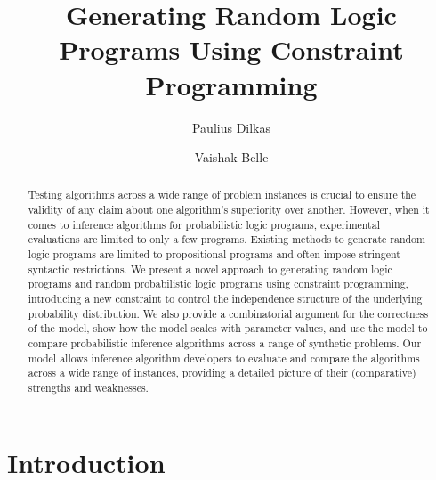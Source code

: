 \documentclass[runningheads]{llncs}
\begin{document}
\title{Generating Random Logic Programs Using Constraint Programming}
\author{Paulius Dilkas \and Vaishak Belle}

\maketitle

\begin{abstract}
  Testing algorithms across a wide range of problem instances is crucial to
  ensure the validity of any claim about one algorithm's superiority over
  another. However, when it comes to inference algorithms for probabilistic
  logic programs, experimental evaluations are limited to only a few programs.
  Existing methods to generate random logic programs are limited to
  propositional programs and often impose stringent syntactic restrictions. We
  present a novel approach to generating random logic programs and random
  probabilistic logic programs using constraint programming, introducing a new
  constraint to control the independence structure of the underlying probability
  distribution. We also provide a combinatorial argument for the correctness of
  the model, show how the model scales with parameter values, and use the model
  to compare probabilistic inference algorithms across a range of synthetic
  problems. Our model allows inference algorithm developers to evaluate and
  compare the algorithms across a wide range of instances, providing a detailed
  picture of their (comparative) strengths and weaknesses.

\end{abstract}

\section{Introduction}
\end{document}
